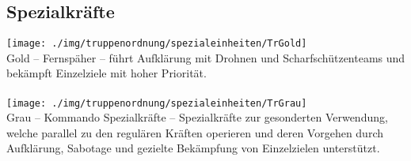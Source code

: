 \subsection{Spezialkräfte}
\texttt{[image: ./img/truppenordnung/spezialeinheiten/TrGold]}\\
Gold -- Fernspäher -- führt Aufklärung mit Drohnen und Scharfschützenteams und bekämpft Einzelziele mit hoher Priorität.\\\\
\texttt{[image: ./img/truppenordnung/spezialeinheiten/TrGrau]}\\
Grau -- Kommando Spezialkräfte -- Spezialkräfte zur gesonderten Verwendung, welche parallel zu den regulären Kräften operieren und deren Vorgehen durch Aufklärung, Sabotage und gezielte Bekämpfung von Einzelzielen unterstützt.
